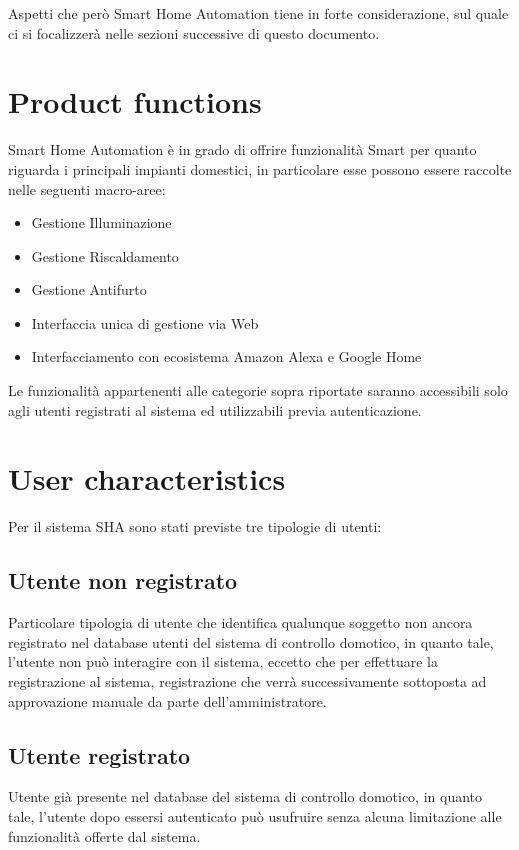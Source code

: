 \documentclass[12pt,a4paper]{report}
\begin{document}
Aspetti che però Smart Home Automation tiene in forte considerazione, sul quale ci si focalizzerà nelle sezioni successive di questo documento.


\section{Product functions}

Smart Home Automation è in grado di offrire funzionalità Smart per quanto riguarda i principali impianti domestici, in particolare esse possono essere raccolte nelle seguenti macro-aree:

\begin{itemize}
\item Gestione Illuminazione
\item Gestione Riscaldamento
\item Gestione Antifurto
\item Interfaccia unica di gestione via Web
\item Interfacciamento con ecosistema Amazon Alexa e Google Home
\end{itemize}

Le funzionalità appartenenti alle categorie sopra riportate saranno accessibili solo agli utenti registrati al sistema ed utilizzabili previa autenticazione.

\section{User characteristics}

Per il sistema SHA sono stati previste tre tipologie di utenti:

\subsection{Utente non registrato}
Particolare tipologia di utente che identifica qualunque soggetto non ancora registrato nel database utenti del sistema di controllo domotico, in quanto tale, l’utente non può interagire con il sistema, eccetto che per effettuare la registrazione al sistema, registrazione che verrà successivamente sottoposta ad approvazione manuale da parte dell’amministratore.

\subsection{Utente registrato}
Utente già presente nel database del sistema di controllo domotico, in quanto tale, l’utente dopo essersi autenticato può usufruire senza alcuna limitazione alle funzionalità offerte dal sistema.
\end{document}
